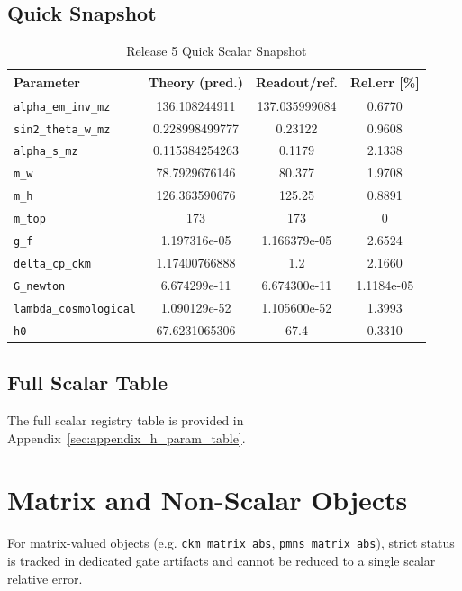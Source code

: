 \documentclass[11pt,a4paper]{article}
\begin{document}
\subsection{Quick Snapshot}
\begin{table}[H]
\centering
\caption{Release 5 Quick Scalar Snapshot}
\label{tab:quick_theory_vs_readout}
\begin{tabular}{|l|c|c|c|}
\hline
\textbf{Parameter} & \textbf{Theory (pred.)} & \textbf{Readout/ref.} & \textbf{Rel.err [\%]} \\
\hline
\texttt{alpha\_em\_inv\_mz} & 136.108244911 & 137.035999084 & 0.6770 \\
\hline
\texttt{sin2\_theta\_w\_mz} & 0.228998499777 & 0.23122 & 0.9608 \\
\hline
\texttt{alpha\_s\_mz} & 0.115384254263 & 0.1179 & 2.1338 \\
\hline
\texttt{m\_w} & 78.7929676146 & 80.377 & 1.9708 \\
\hline
\texttt{m\_h} & 126.363590676 & 125.25 & 0.8891 \\
\hline
\texttt{m\_top} & 173 & 173 & 0 \\
\hline
\texttt{g\_f} & 1.197316e-05 & 1.166379e-05 & 2.6524 \\
\hline
\texttt{delta\_cp\_ckm} & 1.17400766888 & 1.2 & 2.1660 \\
\hline
\texttt{G\_newton} & 6.674299e-11 & 6.674300e-11 & 1.1184e-05 \\
\hline
\texttt{lambda\_cosmological} & 1.090129e-52 & 1.105600e-52 & 1.3993 \\
\hline
\texttt{h0} & 67.6231065306 & 67.4 & 0.3310 \\
\hline
\end{tabular}
\end{table}

\subsection{Full Scalar Table}
The full scalar registry table is provided in Appendix~\ref{sec:appendix_h_param_table}.

\section{Matrix and Non-Scalar Objects}
For matrix-valued objects (e.g. \texttt{ckm\_matrix\_abs}, \texttt{pmns\_matrix\_abs}), strict status is tracked in dedicated gate artifacts and cannot be reduced to a single scalar relative error.
\end{document}
